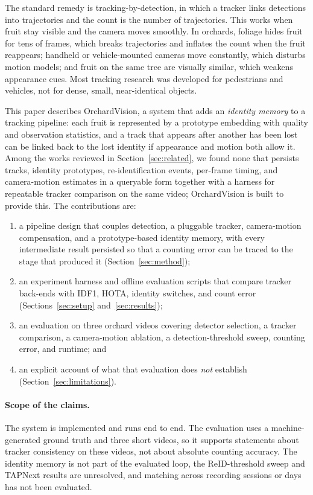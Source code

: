 \documentclass[11pt]{article}
\begin{document}
The standard remedy is tracking-by-detection, in which a tracker links detections into trajectories and the count is the number of trajectories. This works when fruit stay visible and the camera moves smoothly. In orchards, foliage hides fruit for tens of frames, which breaks trajectories and inflates the count when the fruit reappears; handheld or vehicle-mounted cameras move constantly, which disturbs motion models; and fruit on the same tree are visually similar, which weakens appearance cues. Most tracking research was developed for pedestrians and vehicles, not for dense, small, near-identical objects.

This paper describes OrchardVision, a system that adds an \emph{identity memory} to a tracking pipeline: each fruit is represented by a prototype embedding with quality and observation statistics, and a track that appears after another has been lost can be linked back to the lost identity if appearance and motion both allow it. Among the works reviewed in Section~\ref{sec:related}, we found none that persists tracks, identity prototypes, re-identification events, per-frame timing, and camera-motion estimates in a queryable form together with a harness for repeatable tracker comparison on the same video; OrchardVision is built to provide this. The contributions are:

\begin{enumerate}[leftmargin=*]
    \item a pipeline design that couples detection, a pluggable tracker, camera-motion compensation, and a prototype-based identity memory, with every intermediate result persisted so that a counting error can be traced to the stage that produced it (Section~\ref{sec:method});
    \item an experiment harness and offline evaluation scripts that compare tracker back-ends with IDF1, HOTA, identity switches, and count error (Sections~\ref{sec:setup} and~\ref{sec:results});
    \item an evaluation on three orchard videos covering detector selection, a tracker comparison, a camera-motion ablation, a detection-threshold sweep, counting error, and runtime; and
    \item an explicit account of what that evaluation does \emph{not} establish (Section~\ref{sec:limitations}).
\end{enumerate}

\paragraph{Scope of the claims.} The system is implemented and runs end to end. The evaluation uses a machine-generated ground truth and three short videos, so it supports statements about tracker consistency on these videos, not about absolute counting accuracy. The identity memory is not part of the evaluated loop, the ReID-threshold sweep and TAPNext results are unresolved, and matching across recording sessions or days has not been evaluated.
\end{document}
